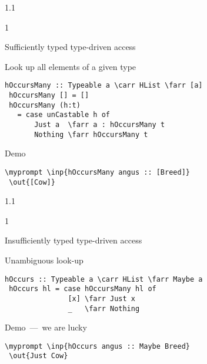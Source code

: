 \documentclass{slides}
\newenvironment{myslide}{\begin{slide}\color{Blue}\begin{boxedminipage}{1.1\hsize}\begin{boxedminipage}{1\hsize}\color{Black}
\vspace{-170\in}
}{%
\smallskip
\end{boxedminipage}
\end{boxedminipage}
\end{slide}}
\newenvironment{myslide}{\begin{slide}
}{%
\end{slide}}
\newenvironment{myslide}{\begin{slide}\color{White}\begin{boxedminipage}{1.1\hsize}\color{Black}
\vspace{-170\in}
}{%
\smallskip
\end{boxedminipage}
\end{slide}}
\newcommand{\header}[1]{{\large \color{Red} #1}}
\newcommand{\inp}[1]{{\color{Brown} \mytextbf{#1}}}
\newcommand{\out}[1]{{\color{Black} \mytextbf{#1}}}
\newcommand{\blau}[1]{{\vspace{-50\in}\normalsize \color{Blue} #1}}
\newcommand{\farr}{\ensuremath{\to}}
\newcommand{\carr}{\ensuremath{\Rightarrow}}
\newcommand{\myprompt}{ghci\ensuremath{>}}
\newcommand{\mytextbf}[1]{\texttt{\textbf{#1}}}
\begin{document}
\begin{myslide}

\header{Sufficiently typed type-driven access}

\blau{Look up all elements of a given type}

\medskip

\begin{Verbatim}[fontfamily=courier,fontsize=\small,commandchars=\\\{\}]
 hOccursMany :: Typeable a \carr HList \farr [a]
 hOccursMany [] = []
 hOccursMany (h:t)
   = case unCastable h of
       Just a  \farr a : hOccursMany t
       Nothing \farr hOccursMany t
\end{Verbatim}

\vspace{-66\in}

\blau{Demo}

\medskip

\begin{Verbatim}[fontfamily=courier,fontsize=\tiny,commandchars=\\\{\}]
 \myprompt \inp{hOccursMany angus :: [Breed]}
 \out{[Cow]}
\end{Verbatim}

\end{myslide}






\begin{myslide}

\header{Insufficiently typed type-driven access}

\blau{Unambiguous look-up}

\medskip

\begin{Verbatim}[fontfamily=courier,fontsize=\small,commandchars=\\\{\}]
 hOccurs :: Typeable a \carr HList \farr Maybe a
 hOccurs hl = case hOccursMany hl of
               [x] \farr Just x
               _   \farr Nothing
\end{Verbatim}

\vspace{-66\in}

\blau{Demo~---~we are lucky}

\medskip

\begin{Verbatim}[fontfamily=courier,fontsize=\tiny,commandchars=\\\{\}]
 \myprompt \inp{hOccurs angus :: Maybe Breed}
 \out{Just Cow}
\end{Verbatim}

\end{myslide}
\end{document}
